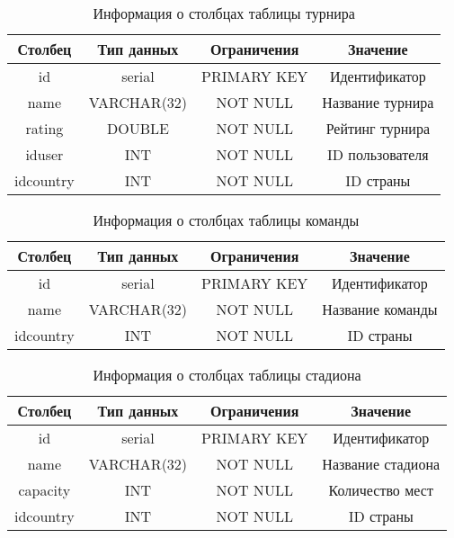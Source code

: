 \begin{table}[H]
	\begin{center}
		\caption{Информация о столбцах таблицы турнира}
		\begin{tabular}{|c|c|c|c|}
			\hline
			Столбец & Тип данных & Ограничения & Значение \\
			\hline
			id & serial & PRIMARY KEY & Идентификатор \\
			\hline
			name & VARCHAR(32) & NOT NULL & Название турнира \\
			\hline
			rating & DOUBLE & NOT NULL & Рейтинг турнира\\
			\hline
			iduser & INT & NOT NULL &  ID пользователя \\
			\hline
			idcountry & INT & NOT NULL & ID страны \\
			\hline
		\end{tabular}
		\label{table:db:league}
	\end{center}
\end{table}

\begin{table}[H]
	\begin{center}
		\caption{Информация о столбцах таблицы команды}
		\begin{tabular}{|c|c|c|c|}
			\hline
			Столбец & Тип данных & Ограничения & Значение \\
			\hline
			id & serial & PRIMARY KEY & Идентификатор \\
			\hline
			name & VARCHAR(32) & NOT NULL & Название команды \\
			\hline
			idcountry & INT & NOT NULL & ID страны \\
			\hline
		\end{tabular}
		\label{table:db:club}
	\end{center}
\end{table}

\begin{table}[H]
	\begin{center}
		\caption{Информация о столбцах таблицы стадиона}
		\begin{tabular}{|c|c|c|c|}
			\hline
			Столбец & Тип данных & Ограничения & Значение \\
			\hline
			id & serial & PRIMARY KEY & Идентификатор \\
			\hline
			name & VARCHAR(32) & NOT NULL & Название стадиона \\
			\hline
			capacity & INT & NOT NULL & Количество мест \\
			\hline
			idcountry & INT & NOT NULL & ID страны \\
			\hline
		\end{tabular}
		\label{table:db:stadium}
	\end{center}
\end{table}

